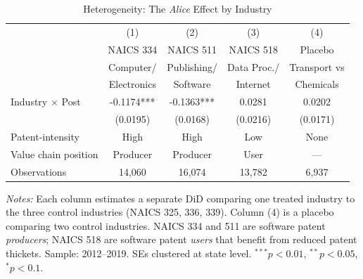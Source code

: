 \begin{table}[t]
\centering
\caption{Heterogeneity: The \textit{Alice} Effect by Industry}
\label{tab:heterogeneity}
\begin{tabular}{lcccc}
\toprule
 & (1) & (2) & (3) & (4) \\
 & NAICS 334 & NAICS 511 & NAICS 518 & Placebo \\
 & Computer/ & Publishing/ & Data Proc./ & Transport vs \\
 & Electronics & Software & Internet & Chemicals \\
\midrule
Industry $\times$ Post & -0.1174*** & -0.1363*** & 0.0281 & 0.0202 \\
 & (0.0195) & (0.0168) & (0.0216) & (0.0171) \\
\midrule
Patent-intensity & High & High & Low & None \\
Value chain position & Producer & Producer & User & --- \\
\midrule
Observations & 14,060 & 16,074 & 13,782 & 6,937 \\
\bottomrule
\end{tabular}
\begin{tablenotes}
\item \textit{Notes:} Each column estimates a separate DiD comparing one treated industry
to the three control industries (NAICS 325, 336, 339). Column (4) is a placebo comparing
two control industries. NAICS 334 and 511 are software patent \emph{producers};
NAICS 518 are software patent \emph{users} that benefit from reduced patent thickets.
Sample: 2012--2019. SEs clustered at state level.
$^{***}p<0.01$, $^{**}p<0.05$, $^{*}p<0.1$.
\end{tablenotes}
\end{table}
